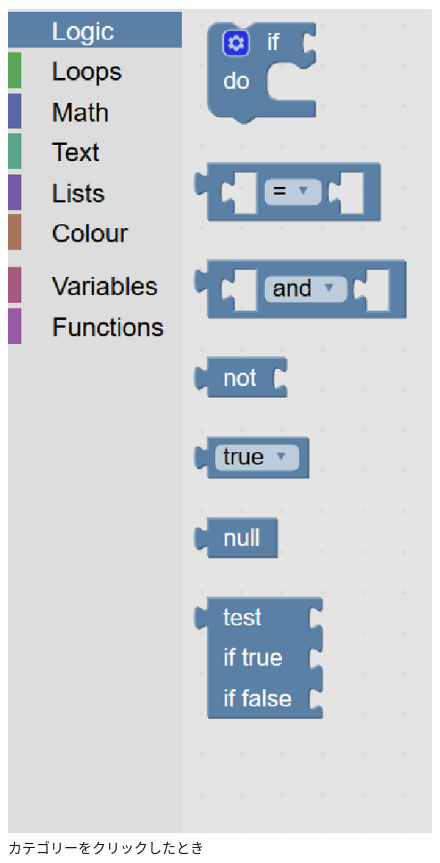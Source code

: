 \documentclass{eniepaper}
\begin{document}
\begin{figure}[h]
\begin{center}
\includegraphics[scale=0.3]{img/blockmenu_open.eps}
\caption{カテゴリーをクリックしたとき}%
\label{fig:blockmenu_open}
\end{center}%
\end{figure}%
\end{document}
